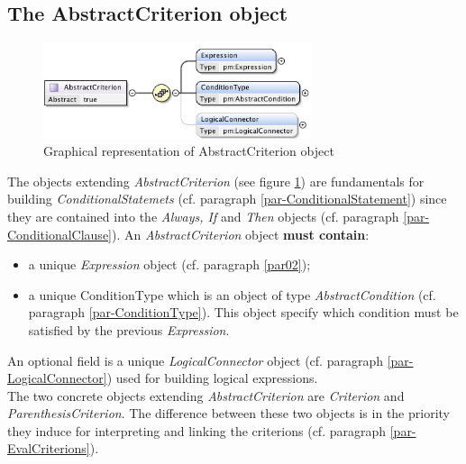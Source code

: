 \documentclass[a4paper,11pt] {article}
\begin{document}
\subsection{The AbstractCriterion object}\label{par-AbstractCriterion}
\begin{figure}[htbp]
\begin{center}
\includegraphics[width=0.7\textwidth]{pictures/AbstractCriterion.jpg} 
\caption{Graphical representation of AbstractCriterion object}
\label{Pic-AbstractCriterion}
\end{center}
\end{figure}
The objects extending {\it AbstractCriterion} (see figure \ref{Pic-AbstractCriterion}) are
fundamentals for building {\it ConditionalStatemets} (cf. paragraph \ref{par-ConditionalStatement})
since they are contained into the {\it Always, If} and {\it Then} objects (cf. paragraph
\ref{par-ConditionalClause}).
An {\it AbstractCriterion} object {\bf must contain}:
\begin{itemize}
\item a unique {\it Expression} object (cf. paragraph \ref{par02});
\item a unique ConditionType which is an object of type {\it AbstractCondition} (cf. paragraph 
\ref{par-ConditionType}).
This object specify which condition must be satisfied by the previous {\it Expression}.
\end{itemize}
An optional field is a unique {\it LogicalConnector} object (cf. paragraph
\ref{par-LogicalConnector}) used for building logical expressions.\\
The two concrete objects extending  {\it AbstractCriterion}  are {\it Criterion} and {\it
ParenthesisCriterion}.  The difference between these two objects is in the priority they induce for
interpreting and linking the criterions (cf. paragraph \ref{par-EvalCriterions}).
\end{document}
